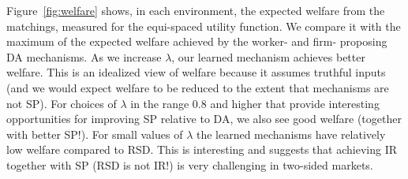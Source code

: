 \documentclass[11pt,letterpaper]{article}
\theoremstyle{definition}
\begin{document}
Figure~\ref{fig:welfare} shows, in each environment, the expected welfare from the matchings,  measured for the equi-spaced utility function. We compare it with the maximum of the expected welfare achieved by the worker-  and firm- proposing DA mechanisms. As we increase $\lambda$, our learned mechanism achieves better welfare. This is an idealized view of welfare because it assumes truthful inputs (and we would expect welfare to be reduced to the extent that mechanisms are not SP).
%
For choices of $\lambda$ in the range 0.8 and higher that provide interesting opportunities for improving SP relative to DA, we also see good welfare (together with better SP!). For small values of $\lambda$ the learned mechanisms have relatively
low welfare compared to RSD. This is interesting and suggests that achieving IR together with SP (RSD is not IR!) is very challenging in two-sided markets.
\end{document}
